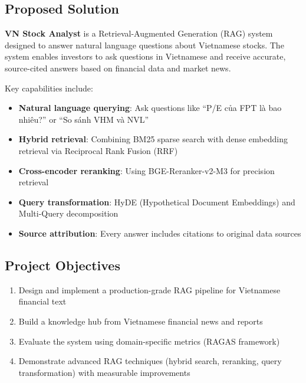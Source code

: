 \documentclass[12pt,a4paper]{article}
\begin{document}
\subsection{Proposed Solution}

\textbf{VN Stock Analyst} is a Retrieval-Augmented Generation (RAG) system
designed to answer natural language questions about Vietnamese stocks. The
system enables investors to ask questions in Vietnamese and receive accurate,
source-cited answers based on financial data and market news.

Key capabilities include:
\begin{itemize}[leftmargin=*]
    \item \textbf{Natural language querying}: Ask questions like ``P/E của FPT
    là bao nhiêu?'' or ``So sánh VHM và NVL''
    \item \textbf{Hybrid retrieval}: Combining BM25 sparse search with dense
    embedding retrieval via Reciprocal Rank Fusion (RRF)
    \item \textbf{Cross-encoder reranking}: Using BGE-Reranker-v2-M3 for
    precision retrieval
    \item \textbf{Query transformation}: HyDE (Hypothetical Document Embeddings)
    and Multi-Query decomposition
    \item \textbf{Source attribution}: Every answer includes citations to
    original data sources
\end{itemize}

\subsection{Project Objectives}

\begin{enumerate}[leftmargin=*]
    \item Design and implement a production-grade RAG pipeline for Vietnamese
    financial text
    \item Build a knowledge hub from Vietnamese financial news and reports
    \item Evaluate the system using domain-specific metrics (RAGAS framework)
    \item Demonstrate advanced RAG techniques (hybrid search, reranking, query
    transformation) with measurable improvements
\end{enumerate}

\end{document}

